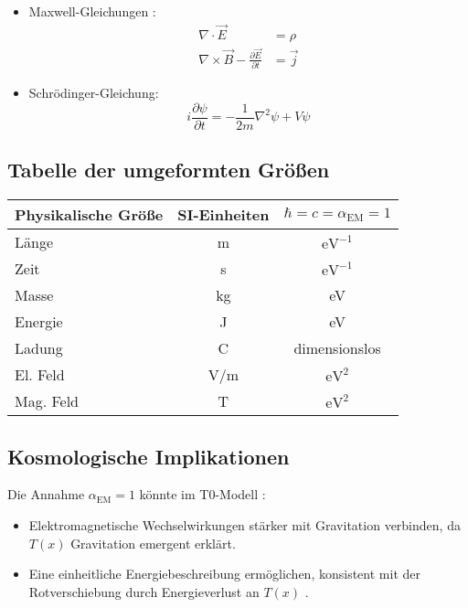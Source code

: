 \documentclass[12pt,a4paper]{article}
\newcommand{\Tfield}{T(x)}
\newcommand{\alphaEM}{\alpha_{\text{EM}}}
\begin{document}
	\begin{itemize}
		\item Maxwell-Gleichungen \cite{Feynman1985}:
		\begin{align}
			\nabla \cdot \vec{E} &= \rho \\
			\nabla \times \vec{B} - \frac{\partial \vec{E}}{\partial t} &= \vec{j}
		\end{align}
		\item Schrödinger-Gleichung:
		\begin{equation}
			i \frac{\partial \psi}{\partial t} = -\frac{1}{2m} \nabla^2 \psi + V \psi
		\end{equation}
	\end{itemize}
	
	\subsection{Tabelle der umgeformten Größen}
	
	\begin{center}
		\begin{tabular}{|l|c|c|}
			\hline
			\textbf{Physikalische Größe} & \textbf{SI-Einheiten} & \textbf{\(\hbar = c = \alphaEM = 1\)} \\
			\hline
			Länge & m & \(\text{eV}^{-1}\) \\
			Zeit & s & \(\text{eV}^{-1}\) \\
			Masse & kg & eV \\
			Energie & J & eV \\
			Ladung & C & dimensionslos \\
			El. Feld & V/m & \(\text{eV}^2\) \\
			Mag. Feld & T & \(\text{eV}^2\) \\
			\hline
		\end{tabular}
	\end{center}
	
	\subsection{Kosmologische Implikationen}
	
	Die Annahme \(\alphaEM = 1\) könnte im T0-Modell \cite{pascher_galaxies_2025}:
	\begin{itemize}
		\item Elektromagnetische Wechselwirkungen stärker mit Gravitation verbinden, da \(\Tfield\) Gravitation emergent erklärt.
		\item Eine einheitliche Energiebeschreibung ermöglichen, konsistent mit der Rotverschiebung durch Energieverlust an \(\Tfield\) \cite{pascher_messdifferenzen_2025}.
	\end{itemize}
	
\end{document}
